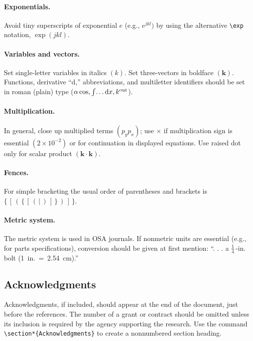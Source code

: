 \documentclass[10pt,letterpaper]{article}
\begin{document}
\paragraph*{\bf Exponentials.} Avoid tiny superscripts of exponential $e$ (e.g.,
$e^{jkl})$ by using the alternative \verb+\exp+ notation,
$\exp(jkl)$.

\paragraph*{\bf Variables and vectors.}
Set single-letter variables in italics $(k)$. Set three-vectors in
boldface $(\mathbf{k})$. Functions, derivative ``d,''
abbreviations, and multiletter identifiers should be set in roman
(plain) type  ($\alpha \cos, \int\!\dots{\rm d}x, k^{\rm out}$).

\paragraph*{\bf Multiplication.}
In general, close up multiplied terms $(p_yp_x)$;
use $\times$ if multiplication sign is essential $(2 \times
10^{-2})$ or for continuation in displayed equations. Use raised dot only for scalar product $(\mathbf{k \cdot k})$.

\paragraph*{\bf Fences.}
For simple bracketing the usual order of parentheses and brackets
is $\{ \, [  \, (  \,  \{  \, [  \, (  \, |  \, )  \, ]  \, \} \,
)  \, ]  \, \}$.


\paragraph*{\bf Metric system.}
The metric system is used in OSA journals. If nonmetric units are
essential (e.g., for parts specifications), conversion should be
given at first mention:  ``. . . a $\frac{1}{4}$\,-in. bolt \mbox{(1 in.
= 2.54 cm).''}

\subsection{Acknowledgments} Acknowledgments, if included, should
appear at the end of the document, just before the references. The
number of a grant or contract should be omitted unless its
inclusion is required by the agency supporting the research. Use
the command \verb+\section*{Acknowledgments}+  to create a
nonnumbered section heading.
\end{document}
